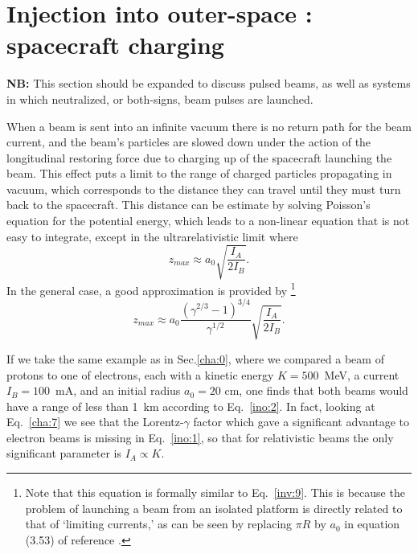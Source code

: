 \documentclass [12pt,a4paper,     ]{report} %
\begin{document}
\section{Injection into outer-space : spacecraft charging}
\label{ino:0}


{\bf NB:} This section should be expanded to discuss pulsed beams, as well as systems in which neutralized, or both-signs, beam pulses are launched.

   When a beam is sent into an infinite vacuum there is no return path for the beam current, and the beam's particles are slowed down under the action of the longitudinal restoring force due to charging up of the spacecraft launching the beam.  This effect puts a limit to the range of charged particles propagating in vacuum, which corresponds to the distance they can travel until they must turn back to the spacecraft.  This distance can be estimate by solving Poisson's equation for the potential energy, which leads to a non-linear equation that is not easy to integrate, except in the ultrarelativistic limit where
%
\begin{equation}\label{ino:1} %
      z_{max} \approx a_0  \sqrt{\frac{I_A}{2I_B}}.
\end{equation}
%
In the general case, a good approximation is provided by \cite{ROSIN1971-, WALLI1975-}\footnote{Note that this equation is formally similar to Eq.~\eqref{inv:9}. This is because the problem of launching a beam from an isolated platform is directly related to that of `limiting currents,' as can be seen by replacing $\pi R$ by $a_0$ in equation (3.53) of reference \cite[p.91]{MILLE1982-}.}
%
\begin{equation}\label{ino:2} %
      z_{max} \approx a_0 \frac{(\gamma^{2/3} -1)^{3/4}}{\gamma^{1/2}}
                          \sqrt{\frac{I_A}{2I_B}}.
\end{equation}
%

     If we take the same example as in Sec.\ref{cha:0}, where we compared a beam of protons to one of  electrons, each with a kinetic energy $K=500$~MeV, a current $I_B=100$~mA, and an initial radius $a_0 = 20$ cm, one finds that both beams would have a range of less than 1~km according to Eq.~\eqref{ino:2}.  In fact, looking at Eq.~\eqref{cha:7} we see that the Lorentz-$\gamma$ factor which gave a significant advantage to electron beams is missing in Eq.~\eqref{ino:1}, so that for relativistic beams the only significant parameter is $I_A \propto K$.
\end{document}
